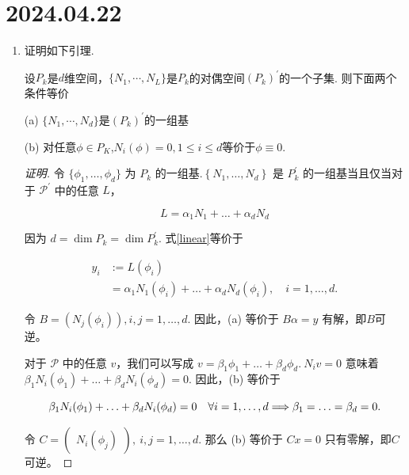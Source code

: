 \documentclass[12pt,a4paper]{article}
\begin{document}
	
	\noindent
	
	\section*{2024.04.22}	
	
	\begin{enumerate}
		\item 证明如下引理.
		
		设$P_k$是$d$维空间，$\{N_1,\cdots,N_L\}$是$P_k$的对偶空间$(P_k)^{\prime}$的一个子集. 则下面两个条件等价
		
		(a) $\{N_1,\cdots,N_d\}$是$(P_k)^{\prime}$的一组基
		
		(b) 对任意$\phi\in P_K$,$N_i(\phi)=0,1\leq i\leq d$等价于$\phi\equiv0.$
		
		\begin{proof}[证明]
			令 $\{\phi_1, \ldots , \phi_d\} $ 为 $P_k$ 的一组基.$\left\{N_1,\ldots,N_d\right\}$ 是 $P_k^{\prime}$ 的一组基当且仅当对于 $\mathcal{P} ^{\prime}$ 中的任意 $L$，
			
			\begin{equation}
				L=\alpha_1N_1+\ldots+\alpha_dN_d  \label{linear}
			\end{equation}
			
			因为 $d= \dim P_k = \dim P_k ^{\prime}$. 式\eqref{linear}等价于
			
			\begin{equation}
				\begin{aligned}
					y_i &:= L(\phi_i) \\
					&= \alpha_1N_1(\phi_i)+\ldots+\alpha_dN_d(\phi_i),\quad i=1,\ldots,d.
				\end{aligned}
			\end{equation}
			
			
			令 $B=\left(N_j(\phi_i)\right),i,j=1,\ldots,d.$ 因此，(a) 等价于 $B\alpha=y$ 有解，即$B$可逆。
			
			对于 $\mathcal{P}$ 中的任意 $v$，我们可以写成 $v=\beta_1\phi_1+\ldots+\beta_d\phi_d.~N_iv=0$ 意味着 $\beta_1N_i(\phi_1)+\ldots+\beta_dN_i(\phi_d)=0.$ 因此，(b) 等价于
			
			\begin{equation}
				\beta_{1}N_{i}(\phi_{1})+\ldots+\beta_{d}N_{i}(\phi_{d})=0\quad\forall i=1,\ldots,d\\\Longrightarrow\beta_{1}=\ldots=\beta_{d}=0.
			\end{equation}
			
			令 $C=\begin{pmatrix}N_i(\phi_j)\end{pmatrix},\:i,j=1,\ldots,d.$ 那么 (b) 等价于 $Cx=0$ 只有零解，即$C$可逆。
			

\end{proof}
\end{enumerate}
\end{document}
